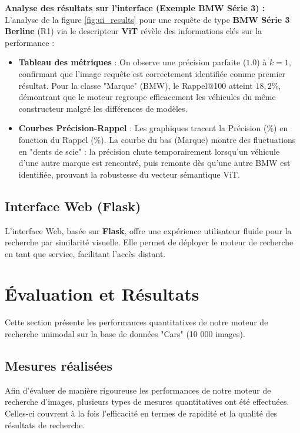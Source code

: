 \documentclass[a4paper,12pt]{report}%
\begin{document}
\noindent \textbf{Analyse des résultats sur l'interface (Exemple BMW Série 3) :}
L'analyse de la figure \ref{fig:ui_results} pour une requête de type \textbf{BMW Série 3 Berline} (R1) via le descripteur \textbf{ViT} révèle des informations clés sur la performance :
\begin{itemize}
    \item \textbf{Tableau des métriques} : On observe une précision parfaite ($1.0$) à $k=1$, confirmant que l'image requête est correctement identifiée comme premier résultat. Pour la classe "Marque" (BMW), le Rappel@100 atteint $18,2\%$, démontrant que le moteur regroupe efficacement les véhicules du même constructeur malgré les différences de modèles.
    \item \textbf{Courbes Précision-Rappel} : Les graphiques tracent la Précision (\%) en fonction du Rappel (\%). La courbe du bas (Marque) montre des fluctuations en "dents de scie" : la précision chute temporairement lorsqu'un véhicule d'une autre marque est rencontré, puis remonte dès qu'une autre BMW est identifiée, prouvant la robustesse du vecteur sémantique ViT.
\end{itemize}

\section{Interface Web (Flask)}
L'interface Web, basée sur \textbf{Flask}, offre une expérience utilisateur fluide pour la recherche par similarité visuelle. Elle permet de déployer le moteur de recherche en tant que service, facilitant l'accès distant.

\chapter{Évaluation et Résultats}
Cette section présente les performances quantitatives de notre moteur de recherche unimodal sur la base de données "Cars" (10 000 images).

\section{Mesures réalisées}
Afin d’évaluer de manière rigoureuse les performances de notre moteur de recherche d’images, plusieurs types de mesures quantitatives ont été effectuées. Celles-ci couvrent à la fois l’efficacité en termes de rapidité et la qualité des résultats de recherche.
\end{document}
